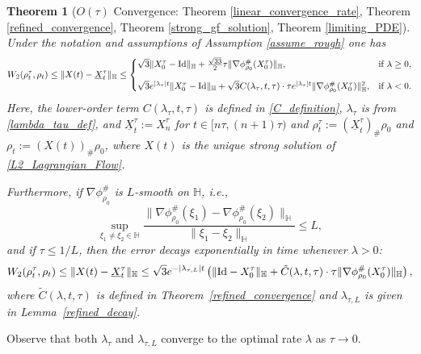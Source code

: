 \documentclass[11pt,a4paper]{amsart}
\newcommand{\1}{\mathds{1}}
\newtheorem{theorem}{\textbf{Theorem}}[section]
\numberwithin{equation}{section}
\begin{document}
\begin{theorem}[$O(\tau)$ Convergence: Theorem \ref{linear_convergence_rate}, Theorem \ref{refined_convergence}, Theorem \ref{strong_gf_solution}, Theorem \ref{limiting_PDE}] \label{lower_order_intro}
Under the notation and assumptions of Assumption \ref{assume_rough} one has
\begin{equation}
W_2(\rho^{\tau}_t,\rho_t) \leq \|X(t) - \underline{X}_t^{\tau}\|_{\mathbb{H}} \leq
\begin{cases}
 \sqrt{3} \|X_0^{\tau} - \textnormal{Id}\|_{\mathbb{H}} 
    + \frac{\sqrt{33}}{2}\tau \| \nabla \phi^{\#}_{\rho_0}(X^{\tau}_0)\|_{\mathbb{H}} 
    , & \text{if } \lambda \geq 0,\\[1em]
\sqrt{3} e^{|\lambda_{\tau}| t} \|X_0^{\tau} - \textnormal{Id}\|_{\mathbb{H}}  
+ \sqrt{3} C(\lambda_{\tau}, t, \tau) \cdot \tau e^{|\lambda_{\tau}| t} \|\nabla \phi^{\#}_{\rho_0}(X_0^{\tau})\|_{\mathbb{H}}^2, & \text{if } \lambda < 0.
\end{cases} \label{rough_convg_intro}
\end{equation}
Here, the lower-order term $C(\lambda_{\tau}, t, \tau)$ is defined in \eqref{C_definition}, $\lambda_{\tau}$ is from \eqref{lambda_tau_def}, and $\underline{X}_t^{\tau} := X_n^{\tau}$ for $t \in [n\tau, (n+1)\tau)$ and $\rho_t^{\tau} := (\underline{X}_t^{\tau})_{\#}\rho_0$ and $\rho_t := (X(t))_{\#} \rho_0$, where $X(t)$ is the unique strong solution of \eqref{L2_Lagrangian_Flow}.
\smallskip

Furthermore, if $\nabla \phi^{\#}_{\rho_0}$ is $L$-smooth on $\mathbb{H}$, i.e.,
\[
\sup_{\xi_1 \neq \xi_2 \in \mathbb{H}} \frac{ \| \nabla \phi^{\#}_{\rho_0}(\xi_1) - \nabla \phi^{\#}_{\rho_0}(\xi_2) \|_{\mathbb{H}}}{\|\xi_1 - \xi_2\|_{\mathbb{H}}} \leq L,
\]
and if $\tau \le 1/L$, then the error decays exponentially in time whenever $\lambda > 0$:
\begin{equation}
W_2(\rho^{\tau}_t,\rho_t) \leq \|X(t) - \underline{X}_t^{\tau}\|_{\mathbb{H}} \leq \sqrt{3} e^{-|\lambda_{\tau,L}| t} \left( \|\textnormal{Id} - X_0^{\tau}\|_{\mathbb{H}} + \tilde{C}(\lambda, t, \tau) \cdot \tau \|\nabla \phi^{\#}_{\rho_0}(X_0^{\tau})\|_{\mathbb{H}} \right), \label{refined_decay_rates123}
\end{equation}
where $\tilde{C}(\lambda, t, \tau)$ is defined in Theorem~\ref{refined_convergence} and $\lambda_{\tau,L}$ is given in Lemma~\ref{refined_decay}. \smallskip
\end{theorem}

Observe that both $\lambda_{\tau}$ and $\lambda_{\tau,L}$ converge to the optimal rate $\lambda$ as $\tau \to 0$.
\smallskip
\end{document}
